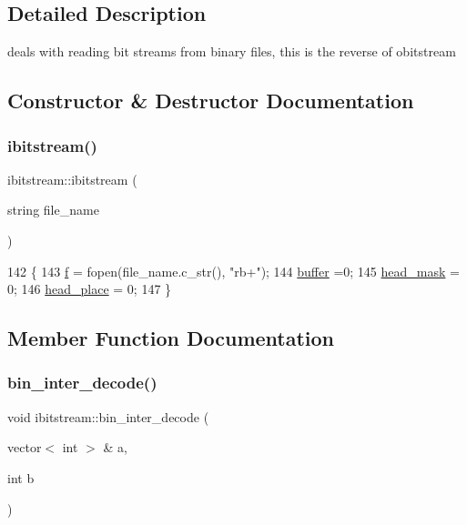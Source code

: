 \subsection{Detailed Description}
deals with reading bit streams from binary files, this is the reverse of obitstream 

\subsection{Constructor \& Destructor Documentation}
\mbox{\label{classibitstream_af5f00b64072ed3ffe495b7712a71e3eb}} 
\subsubsection{\texorpdfstring{ibitstream()}{ibitstream()}}
{\footnotesize\ttfamily ibitstream\+::ibitstream (\begin{DoxyParamCaption}\item[{string}]{file\+\_\+name }\end{DoxyParamCaption})\hspace{0.3cm}{\ttfamily [inline]}}


\begin{DoxyCode}
142                               \{
143     \hyperlink{classibitstream_a3ea2cdd0cf97820f0e1520c42e364308}{f} = fopen(file\_name.c\_str(), \textcolor{stringliteral}{"rb+"});
144     \hyperlink{classibitstream_a73f0b24d3d4402369f1abbb43f7f70ef}{buffer} =0;
145     \hyperlink{classibitstream_a48cd41991b6c29ea5120b53873a72a70}{head\_mask} = 0;
146     \hyperlink{classibitstream_a7b96359ac1534a5565e6e9b0cc53a0b3}{head\_place} = 0;
147   \}
\end{DoxyCode}


\subsection{Member Function Documentation}
\mbox{\label{classibitstream_a4d1bfd02f98f6af2ac4d80034b23e26d}} 
\subsubsection{\texorpdfstring{bin\+\_\+inter\+\_\+decode()}{bin\_inter\_decode()}\hspace{0.1cm}{\footnotesize\ttfamily [1/2]}}
{\footnotesize\ttfamily void ibitstream\+::bin\+\_\+inter\+\_\+decode (\begin{DoxyParamCaption}\item[{vector$<$ int $>$ \&}]{a,  }\item[{int}]{b }\end{DoxyParamCaption})}




